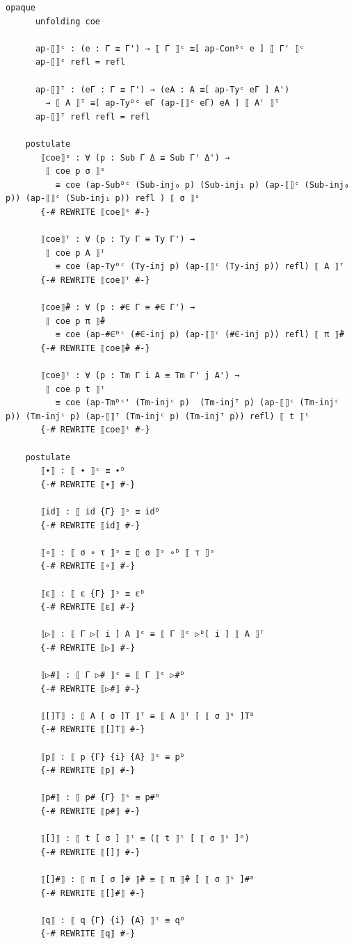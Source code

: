 \documentclass[10pt,a4paper]{article}
\theoremstyle{definition}
\theoremstyle{remark}
\begin{document}
{\begin{Verbatim}[breaklines=true,breakanywhere=true,fontsize=\scriptsize]
    opaque
      unfolding coe

      ap-⟦⟧ᶜ : (e : Γ ≡ Γ') → ⟦ Γ ⟧ᶜ ≡[ ap-Conᴰᶜ e ] ⟦ Γ' ⟧ᶜ
      ap-⟦⟧ᶜ refl = refl

      ap-⟦⟧ᵀ : (eΓ : Γ ≡ Γ') → (eA : A ≡[ ap-Tyᶜ eΓ ] A')
        → ⟦ A ⟧ᵀ ≡[ ap-Tyᴰᶜ eΓ (ap-⟦⟧ᶜ eΓ) eA ] ⟦ A' ⟧ᵀ
      ap-⟦⟧ᵀ refl refl = refl

    postulate
       ⟦coe⟧ˢ : ∀ (p : Sub Γ Δ ≡ Sub Γ' Δ') →
        ⟦ coe p σ ⟧ˢ
          ≡ coe (ap-Subᴰᶜ (Sub-inj₀ p) (Sub-inj₁ p) (ap-⟦⟧ᶜ (Sub-inj₀ p)) (ap-⟦⟧ᶜ (Sub-inj₁ p)) refl ) ⟦ σ ⟧ˢ
       {-# REWRITE ⟦coe⟧ˢ #-}

       ⟦coe⟧ᵀ : ∀ (p : Ty Γ ≡ Ty Γ') →
        ⟦ coe p A ⟧ᵀ
          ≡ coe (ap-Tyᴰᶜ (Ty-inj p) (ap-⟦⟧ᶜ (Ty-inj p)) refl) ⟦ A ⟧ᵀ
       {-# REWRITE ⟦coe⟧ᵀ #-}

       ⟦coe⟧̂# : ∀ (p : #∈ Γ ≡ #∈ Γ') →
        ⟦ coe p π ⟧̂#
          ≡ coe (ap-#∈ᴰᶜ (#∈-inj p) (ap-⟦⟧ᶜ (#∈-inj p)) refl) ⟦ π ⟧̂#
       {-# REWRITE ⟦coe⟧̂# #-}

       ⟦coe⟧ᵗ : ∀ (p : Tm Γ i A ≡ Tm Γ' j A') →
        ⟦ coe p t ⟧ᵗ
          ≡ coe (ap-Tmᴰᶜ' (Tm-injᶜ p)  (Tm-injᵀ p) (ap-⟦⟧ᶜ (Tm-injᶜ p)) (Tm-injⁱ p) (ap-⟦⟧ᵀ (Tm-injᶜ p) (Tm-injᵀ p)) refl) ⟦ t ⟧ᵗ
       {-# REWRITE ⟦coe⟧ᵗ #-}

    postulate
       ⟦∙⟧ : ⟦ ∙ ⟧ᶜ ≡ ∙ᴰ
       {-# REWRITE ⟦∙⟧ #-}

       ⟦id⟧ : ⟦ id {Γ} ⟧ˢ ≡ idᴰ
       {-# REWRITE ⟦id⟧ #-}

       ⟦∘⟧ : ⟦ σ ∘ τ ⟧ˢ ≡ ⟦ σ ⟧ˢ ∘ᴰ ⟦ τ ⟧ˢ
       {-# REWRITE ⟦∘⟧ #-}

       ⟦ε⟧ : ⟦ ε {Γ} ⟧ˢ ≡ εᴰ
       {-# REWRITE ⟦ε⟧ #-}

       ⟦▷⟧ : ⟦ Γ ▷[ i ] A ⟧ᶜ ≡ ⟦ Γ ⟧ᶜ ▷ᴰ[ i ] ⟦ A ⟧ᵀ
       {-# REWRITE ⟦▷⟧ #-}

       ⟦▷#⟧ : ⟦ Γ ▷# ⟧ᶜ ≡ ⟦ Γ ⟧ᶜ ▷#ᴰ
       {-# REWRITE ⟦▷#⟧ #-}

       ⟦[]T⟧ : ⟦ A [ σ ]T ⟧ᵀ ≡ ⟦ A ⟧ᵀ [ ⟦ σ ⟧ˢ ]Tᴰ
       {-# REWRITE ⟦[]T⟧ #-}

       ⟦p⟧ : ⟦ p {Γ} {i} {A} ⟧ˢ ≡ pᴰ
       {-# REWRITE ⟦p⟧ #-}

       ⟦p#⟧ : ⟦ p# {Γ} ⟧ˢ ≡ p#ᴰ
       {-# REWRITE ⟦p#⟧ #-}
       
       ⟦[]⟧ : ⟦ t [ σ ] ⟧ᵗ ≡ (⟦ t ⟧ᵗ [ ⟦ σ ⟧ˢ ]ᴰ)
       {-# REWRITE ⟦[]⟧ #-}

       ⟦[]#⟧ : ⟦ π [ σ ]# ⟧̂# ≡ ⟦ π ⟧̂# [ ⟦ σ ⟧ˢ ]#ᴰ
       {-# REWRITE ⟦[]#⟧ #-}

       ⟦q⟧ : ⟦ q {Γ} {i} {A} ⟧ᵗ ≡ qᴰ
       {-# REWRITE ⟦q⟧ #-}


\end{Verbatim}}
\end{document}
